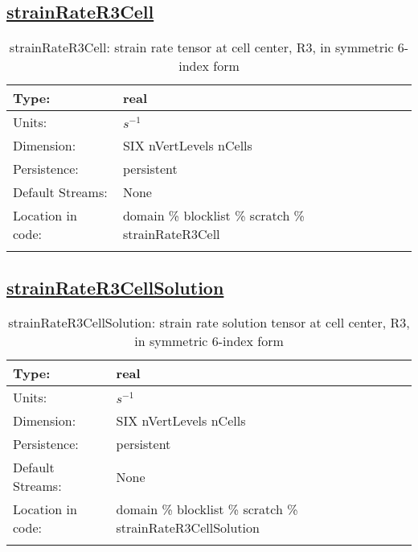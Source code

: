 \subsection[strainRateR3Cell]{\hyperref[sec:var_tab_scratch]{strainRateR3Cell}}
\label{subsec:var_sec_scratch_strainRateR3Cell}
\begin{center}
\begin{longtable}{| p{2.0in} | p{4.0in} |}
        \hline 
        Type: & real \\
        \hline 
        Units: & $s^{-1}$ \\
        \hline 
        Dimension: & SIX nVertLevels nCells \\
        \hline 
        Persistence: & persistent \\
        \hline 
		 Default Streams: & None \\
        \hline 
		 Location in code: & domain \% blocklist \% scratch \% strainRateR3Cell \\
		 \hline 
    \caption{strainRateR3Cell: strain rate tensor at cell center, R3, in symmetric 6-index form}
\end{longtable}
\end{center}
\subsection[strainRateR3CellSolution]{\hyperref[sec:var_tab_scratch]{strainRateR3CellSolution}}
\label{subsec:var_sec_scratch_strainRateR3CellSolution}
\begin{center}
\begin{longtable}{| p{2.0in} | p{4.0in} |}
        \hline 
        Type: & real \\
        \hline 
        Units: & $s^{-1}$ \\
        \hline 
        Dimension: & SIX nVertLevels nCells \\
        \hline 
        Persistence: & persistent \\
        \hline 
		 Default Streams: & None \\
        \hline 
		 Location in code: & domain \% blocklist \% scratch \% strainRateR3CellSolution \\
		 \hline 
    \caption{strainRateR3CellSolution: strain rate solution tensor at cell center, R3, in symmetric 6-index form}
\end{longtable}
\end{center}
